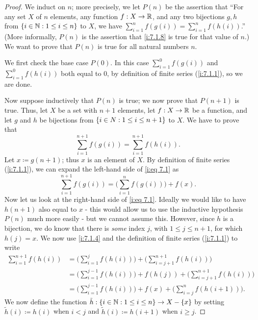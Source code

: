 \begin{proof}
  We induct on \(n\);
  more precisely, we let \(P(n)\) be the assertion that ``For any set \(X\) of \(n\) elements, any function \(f : X \to \mathbb{R}\), and any two bijections \(g, h\) from \(\left\lbrace i \in \mathbb{N} : 1 \leq i \leq n\right\rbrace\) to \(X\), we have \(\sum_{i = 1}^n f(g(i)) = \sum_{i = 1}^n f(h(i))\).''
  (More informally, \(P(n)\) is the assertion that \cref{i:7.1.8} is true for that value of \(n\).)
  We want to prove that \(P(n)\) is true for all natural numbers \(n\).

  We first check the base case \(P(0)\).
  In this case \(\sum_{i = 1}^0 f(g(i))\) and \(\sum_{i = 1}^0 f(h(i))\) both equal to \(0\), by definition of finite series (\cref{i:7.1.1}), so we are done.

  Now suppose inductively that \(P(n)\) is true;
  we now prove that \(P(n + 1)\) is true.
  Thus, let \(X\) be a set with \(n + 1\) elements, let \(f : X \to \mathbb{R}\) be a function, and let \(g\) and \(h\) be bijections from \(\left\lbrace i \in N : 1 \leq i \leq n + 1\right\rbrace\) to \(X\).
  We have to prove that
  \[
    \sum_{i = 1}^{n + 1} f(g(i)) = \sum_{i = 1}^{n + 1} f(h(i)). \tag{i:7.1}\label{i:eq 7.1}
  \]
  Let \(x \coloneqq g(n + 1)\);
  thus \(x\) is an element of \(X\).
  By definition of finite series (\cref{i:7.1.1}), we can expand the left-hand side of \cref{i:eq 7.1} as
  \[
    \sum_{i = 1}^{n + 1} f(g(i)) = \Bigg(\sum_{i = 1}^n f(g(i))\Bigg) + f(x).
  \]
  Now let us look at the right-hand side of \cref{i:eq 7.1}.
  Ideally we would like to have \(h(n + 1)\) also equal to \(x\)
  - this would allow us to use the inductive hypothesis \(P(n)\) much more easily
  - but we cannot assume this.
  However, since \(h\) is a bijection, we do know that there is \emph{some} index \(j\), with \(1 \leq j \leq n + 1\), for which \(h(j) = x\).
  We now use \cref{i:7.1.4} and the definition of finite series (\cref{i:7.1.1}) to write
  \begin{align*}
    \sum_{i = 1}^{n + 1} f(h(i)) & = \Bigg(\sum_{i = 1}^j f(h(i))\Bigg) + \Bigg(\sum_{i = j + 1}^{n + 1} f(h(i))\Bigg)                 \\
                                 & = \Bigg(\sum_{i = 1}^{j - 1} f(h(i))\Bigg) + f(h(j)) + \Bigg(\sum_{i = j + 1}^{n + 1} f(h(i))\Bigg) \\
                                 & = \Bigg(\sum_{i = 1}^{j - 1} f(h(i))\Bigg) + f(x) + \Bigg(\sum_{i = j}^n f(h(i + 1))\Bigg).
  \end{align*}
  We now define the function \(\tilde{h} : \left\lbrace i \in \mathbb{N} : 1 \leq i \leq n\right\rbrace \to X - \left\lbrace x\right\rbrace\) by setting \(\tilde{h}(i) \coloneqq h(i)\) when \(i < j\) and \(\tilde{h}(i) \coloneqq h(i + 1)\) when \(i \geq j\).

\end{proof}
